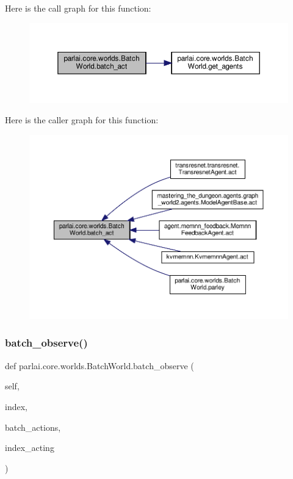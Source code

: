 Here is the call graph for this function\+:
\nopagebreak
\begin{figure}[H]
\begin{center}
\leavevmode
\includegraphics[width=350pt]{classparlai_1_1core_1_1worlds_1_1BatchWorld_a0bf69fe51e7eb0f8ba2fc3748c8c9181_cgraph}
\end{center}
\end{figure}
Here is the caller graph for this function\+:
\nopagebreak
\begin{figure}[H]
\begin{center}
\leavevmode
\includegraphics[width=350pt]{classparlai_1_1core_1_1worlds_1_1BatchWorld_a0bf69fe51e7eb0f8ba2fc3748c8c9181_icgraph}
\end{center}
\end{figure}
\mbox{\label{classparlai_1_1core_1_1worlds_1_1BatchWorld_a01faab842dc28b580dcaeacee491c5f5}} 
\subsubsection{\texorpdfstring{batch\+\_\+observe()}{batch\_observe()}}
{\footnotesize\ttfamily def parlai.\+core.\+worlds.\+Batch\+World.\+batch\+\_\+observe (\begin{DoxyParamCaption}\item[{}]{self,  }\item[{}]{index,  }\item[{}]{batch\+\_\+actions,  }\item[{}]{index\+\_\+acting }\end{DoxyParamCaption})}

